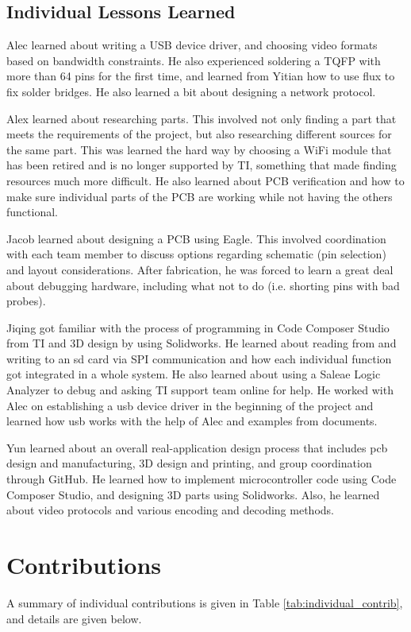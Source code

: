\documentclass[12pt]{article}
\begin{document}
\subsection{Individual Lessons Learned}
Alec learned about writing a USB device driver, and choosing video formats
based on bandwidth constraints. He also experienced soldering a TQFP with more
than 64 pins for the first time, and learned from Yitian how to use flux to fix
solder bridges. He also learned a bit about designing a network protocol.

Alex learned about researching parts. This involved not only finding a part
that meets the requirements of the project, but also researching different
sources for the same part. This was learned the hard way by choosing a WiFi
module that has been retired and is no longer supported by TI, something that
made finding resources much more difficult. He also learned about PCB
verification and how to make sure individual parts of the PCB are working while
not having the others functional. 

Jacob learned about designing a PCB using Eagle. This involved coordination
with each team member to discuss options regarding schematic (pin selection)
and layout considerations. After fabrication, he was forced to learn a great
deal about debugging hardware, including what not to do (i.e. shorting pins
with bad probes).

Jiqing got familiar with the process of programming in Code Composer Studio
from TI and 3D design by using Solidworks. He learned about reading from and
writing to an \gls{sd} card via SPI communication and how each individual
function got integrated in a whole system. He also learned about using a Saleae
Logic Analyzer to debug and asking TI support team online for help. He worked
with Alec on establishing a \gls{usb} device driver in the beginning of the
project and learned how \gls{usb} works with the help of Alec and examples from
documents.

Yun learned about an overall real-application design process that includes
\gls{pcb} design and manufacturing, 3D design and printing, and group
coordination through GitHub. He learned how to implement microcontroller code
using Code Composer Studio, and designing 3D parts using Solidworks. Also, he
learned about video protocols and various encoding and decoding methods.

\section{Contributions}
A summary of individual contributions is given in Table
\ref{tab:individual_contrib}, and details are given below.
\end{document}
